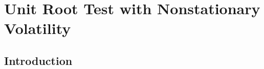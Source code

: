 \chapter{Unit Root Test with Nonstationary Volatility}
\ifpdf
    \graphicspath{{Chapter3/Chapter3Figs/PNG/}{Chapter3/Chapter3Figs/PDF/}{Chapter3/Chapter3Figs/}}
\else
    \graphicspath{{Chapter3/Chapter3Figs/EPS/}{Chapter3/Chapter3Figs/}}
\fi

\section{Introduction}



